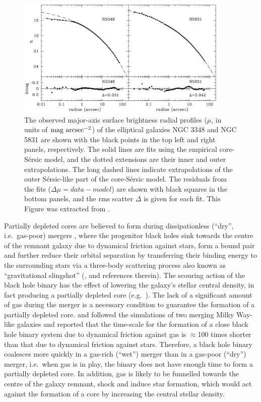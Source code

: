 \begin{figure}[htb] 
\begin{center}
\includegraphics[width=0.9\textwidth]{images/sersiccoresersic.eps}
\end{center}
\caption{
The observed major-axis surface brightness radial profiles ($\mu$, in units of $\rm mag~arcsec^{-2}$) 
of the elliptical galaxies NGC 3348 and NGC 5831 
are shown with the black points in the top left and right panels, respectively. 
The solid lines are fits using the empirical core-S\'ersic model, 
and the dotted extensions are their inner and outer extrapolations. 
The long dashed lines indicate extrapolations of the outer S\'ersic-like part of the core-S\'ersic model. 
The residuals from the fits ($\Delta \mu = data - model$) are shown with black squares in the bottom panels, 
and the rms scatter $\Delta$ is given for each fit. 
This Figure was extracted from \cite{graham2003coresersicmodel}. }
\label{fig:corser}
\end{figure}

Partially depleted cores are believed to form during dissipationless (``dry'', i.e.~gas-poor) mergers \citep{begelman1980}, 
where the progenitor black holes sink towards the centre of the remnant galaxy due to dynamical friction against stars, 
form a bound pair and further reduce their orbital separation by transferring their binding energy to the surrounding stars 
via a three-body scattering process also known as ``gravitational slingshot'' 
(\citealt{milosavljevicmerritt2001,merritt2013CQG}, and references therein). 
The scouring action of the black hole binary has the effect of lowering the galaxy's stellar central density, 
in fact producing a partially depleted core 
(e.g.~\citealt{merritt2006RPP,dotti2012,colpi2014}). 
The lack of a significant amount of gas during the merger is a necessary condition 
to guarantee the formation of a partially depleted core. 
\cite{mayer2009} and \cite{colpi2009} followed the simulations of two merging Milky Way-like galaxies 
and reported that the time-scale for the formation of a close black hole binary system due to dynamical friction against gas 
is $\approx$100 times shorter than that due to dynamical friction against stars. 
Therefore, a black hole binary coalesces more quickly in a gas-rich (``wet'') merger than in a gas-poor (``dry'') merger, 
i.e.~when gas is in play, the binary does not have enough time to form a partially depleted core. 
In addition, gas is likely to be funnelled towards the centre of the galaxy remnant, shock and induce star formation, 
which would act against the formation of a core by increasing the central stellar density. 


